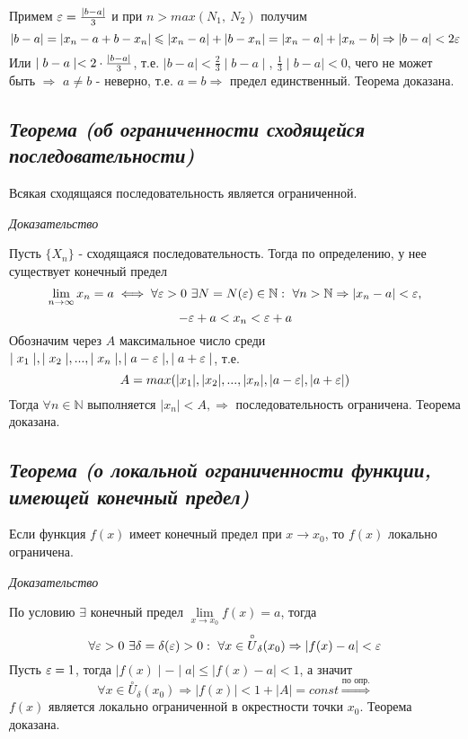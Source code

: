 Примем ${\large\varepsilon} = {\large\frac{\mid  b - a\mid  }{3}}$ и при $n > max(N_1, \ N_2)$ получим $$| b - a|  = | x_n - a + b - x_n|  \leqslant | x_n - a|  + | b - x_n|  = | x_n - a|  + | x_n - b|  \Rightarrow | b - a|  < 2{\large\varepsilon}$$ Или $\mid  b-a\mid   < 2 \cdot {\large\frac{\mid  b - a\mid  }{3}}$, т.е. $\mid  b-a\mid   < \frac{2}{3}\mid  b - a\mid  $, $\frac{1}{3}\mid  b-a\mid   < 0$, чего не может быть $\Rightarrow$ $a \neq b$ - неверно, т.е. $a = b \Rightarrow$ предел единственный. Теорема доказана.
\newpage 
\subsection{\textit{Теорема (об ограниченности сходящейся последовательности)}}

Всякая сходящаяся последовательность является ограниченной.

\textit{Доказательство}

Пусть $\{X_n\}$ - сходящаяся последовательность. Тогда по определению, у нее существует конечный предел $$\lim\limits_{n \to \infty}x_n = a \iff \forall {\large\varepsilon} > 0 \ \exists N = N({\large\varepsilon})\in \mathbb{N}: \ \forall n > \mathbb{N} \Rightarrow | x_n - a|  < {\large\varepsilon},$$ $$-{\large\varepsilon}+a < x_n < {\large\varepsilon} + a$$ Обозначим через $A$ максимальное число среди $\mid  x_1\mid  , \mid  x_2\mid  , ..., \mid  x_n\mid  , \mid  a-{\large\varepsilon}\mid  , \mid  a + {\large\varepsilon}\mid  $, т.е. $$A = max(| x_1| , | x_2| , ..., | x_n| , | a-{\large\varepsilon}| , | a + {\large\varepsilon}| )$$ Тогда $\forall n \in \mathbb{N}$ выполняется $\mid  x_n\mid   < A, \Rightarrow$ последовательность ограничена. Теорема доказана.
\newpage 
\subsection{\textit{Теорема (о локальной ограниченности функции, имеющей конечный предел)}}

Если функция $f(x)$ имеет конечный предел при $x \rightarrow x_0$, то $f(x)$ локально ограничена.

\textit{Доказательство}

По условию $\exists$ конечный предел $\lim\limits_{x \to x_0}f(x) = a$, тогда $$\forall {\large\varepsilon} > 0 \ \exists\delta=\delta({\large\varepsilon} )>0: \ \forall x \in \overset{\circ}U_\delta(x_0) \Rightarrow | f(x) - a|  < {\large\varepsilon}$$ Пусть ${\large\varepsilon} = 1$, тогда $\mid  f(x)\mid   - \mid  a\mid   \leqslant \mid  f(x) - a\mid   < 1$, а значит $$\forall x \in \overset{\circ}U_\delta(x_0) \Rightarrow | f(x)|  <1 + | A|  = const \overset{\text{по опр.}}{\Rightarrow}$$ $f(x)$ является локально ограниченной в окрестности точки $x_0$. Теорема доказана.
\newpage 
